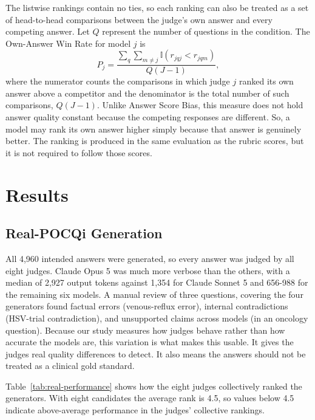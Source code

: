 \documentclass[11pt]{article}
\begin{document}
The listwise rankings contain no ties, so each ranking can also be treated as a set of head-to-head comparisons between the judge's own answer and every competing answer. Let $Q$ represent the number of questions in the condition. The Own-Answer Win Rate for model $j$ is
\begin{equation}
P_j=\frac{\sum_q\sum_{m\ne j}\mathbb{I}(r_{jqj}<r_{jqm})}{Q(J-1)},
\end{equation}
where the numerator counts the comparisons in which judge $j$ ranked its own answer above a competitor and the denominator is the total number of such comparisons, $Q(J-1)$. Unlike Answer Score Bias, this measure does not hold answer quality constant because the competing responses are different. So, a model may rank its own answer higher simply because that answer is genuinely better. The ranking is produced in the same evaluation as the rubric scores, but it is not required to
follow those scores.



\section{Results}

\subsection{Real-POCQi Generation}

All 4,960 intended answers were generated, so every answer was judged by all eight judges. Claude Opus 5 was much more verbose than the others, with a median of 2,927 output tokens against 1,354 for Claude Sonnet 5 and 656-988 for the remaining six models. A manual review of three questions, covering the four generators found factual errors (venous-reflux error), internal contradictions (HSV-trial contradiction), and unsupported claims across models (in an oncology question). Because our study measures how judges behave rather than how accurate the models are, this variation is what makes this usable. It gives the judges real quality differences to detect. It also means the answers should not be treated as a clinical gold standard.

Table~\ref{tab:real-performance} shows how the eight judges collectively ranked the generators. With eight candidates the average rank is 4.5, so values below 4.5 indicate above-average performance in the judges' collective rankings.
\end{document}
